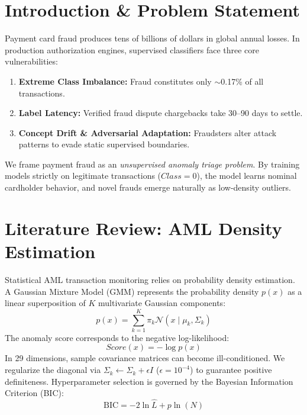 \documentclass[conference]{IEEEtran}
\begin{document}
\section{Introduction \& Problem Statement}
Payment card fraud produces tens of billions of dollars in global annual losses. In production authorization engines, supervised classifiers face three core vulnerabilities:
\begin{enumerate}
    \item \textbf{Extreme Class Imbalance:} Fraud constitutes only $\sim$0.17\% of all transactions.
    \item \textbf{Label Latency:} Verified fraud dispute chargebacks take 30--90 days to settle.
    \item \textbf{Concept Drift \& Adversarial Adaptation:} Fraudsters alter attack patterns to evade static supervised boundaries.
\end{enumerate}
We frame payment fraud as an \textit{unsupervised anomaly triage problem}. By training models strictly on legitimate transactions ($Class = 0$), the model learns nominal cardholder behavior, and novel frauds emerge naturally as low-density outliers.

\section{Literature Review: AML Density Estimation}
Statistical AML transaction monitoring relies on probability density estimation. A Gaussian Mixture Model (GMM) represents the probability density $p(x)$ as a linear superposition of $K$ multivariate Gaussian components:
\begin{equation}
p(x) = \sum_{k=1}^K \pi_k \mathcal{N}(x \mid \mu_k, \Sigma_k)
\end{equation}
The anomaly score corresponds to the negative log-likelihood:
\begin{equation}
Score(x) = -\log p(x)
\end{equation}
In 29 dimensions, sample covariance matrices can become ill-conditioned. We regularize the diagonal via $\Sigma_k \leftarrow \Sigma_k + \epsilon I$ ($\epsilon = 10^{-4}$) to guarantee positive definiteness. Hyperparameter selection is governed by the Bayesian Information Criterion (BIC):
\begin{equation}
\text{BIC} = -2 \ln \hat{L} + p \ln(N)
\end{equation}
\end{document}

